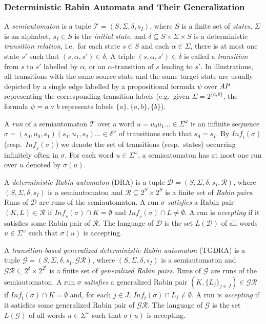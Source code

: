 \documentclass{llncs}
\newcommand{\AP}{\mathit{A\hskip-0.1ex P}}
\newcommand{\mD}{\mathcal{D}}
\newcommand{\mG}{\mathcal{G}}
\newcommand{\mT}{\mathcal{T}}
\newcommand{\Inf}{\mathit{Inf\!}}
\begin{document}
\subsubsection{Deterministic Rabin Automata and Their Generalization}



A \emph{semiautomaton} is a tuple $\mT=(S,\Sigma,\delta,s_I)$, where $S$ is
a finite set of \emph{states}, $\Sigma$ is an alphabet, $s_I\in S$ is the
\emph{initial state}, and $\delta\subseteq S\times\Sigma\times S$ is a
deterministic \emph{transition relation}, i.e.~for each state $s\in S$ and
each $\alpha\in\Sigma$, there is at most one state $s'$ such that
$(s,\alpha,s')\in\delta$. A triple $(s,\alpha,s')\in\delta$ is called a
\emph{transition} from $s$ to $s'$ labelled by $\alpha$, or an
$\alpha$-transition of $s$ leading to $s'$.  In illustrations, all
transitions with the same source state and the same target state are usually
depicted by a single edge labelled by a propositional formula $\psi$ over
$\AP$ representing the corresponding transition labels (e.g.~given
$\Sigma=2^{\{a,b\}}$, the formula $\psi=a\vee b$ represents labels
$\{a\},\{a,b\},\{b\}$).

A \emph{run} of a semiautomaton $\mT$ over a word $u=
u_0u_1\ldots\in\Sigma^\omega$ is an infinite sequence $\sigma=
(s_0,u_0,s_1)(s_1,u_1,s_2)\ldots\in\delta^\omega$ of transitions such that
$s_0=s_I$. By $\Inf_t(\sigma)$ (resp.~$\Inf_s(\sigma)$) we denote the set of
transitions (resp.~states) occurring infinitely often in $\sigma$. For each
word $u\in\Sigma^\omega$, a semiautomaton has at most one run over $u$
denoted by $\sigma(u)$.

A \emph{deterministic Rabin automaton} (DRA) is a tuple
$\mD=(S,\Sigma,\delta,s_I,\mathcal{R})$, where $(S,\Sigma,\delta,s_I)$ is a
semiautomaton and $\mathcal{R} \subseteq 2^{S} \times 2^{S}$ is a finite set
of \emph{Rabin pairs}.
Runs of $\mD$ are runs of the semiautomaton.  A run $\sigma$ \emph{satisfies}
a Rabin pair $(K,L)\in\mathcal{R}$ if $\Inf_s(\sigma)\cap K=\emptyset$ and
$\Inf_s(\sigma)\cap L\neq\emptyset$.  A run is \emph{accepting} if it
satisfies some Rabin pair of $\mathcal{R}$. The language of $\mD$ is the set
$L(\mD)$ of all words $u\in\Sigma^\omega$ such that $\sigma(u)$ is
accepting.



A \emph{transition-based generalized deterministic Rabin automaton} (TGDRA)
is a tuple $\mG=(S,\Sigma,\delta,s_I,\mathcal{GR})$, where
$(S,\Sigma,\delta,s_I)$ is a semiautomaton and $\mathcal{GR} \subseteq
2^{\delta} \times 2^{2^{\delta}}$ is a finite set of \emph{generalized Rabin
  pairs}.  
Runs of $\mG$ are runs of the semiautomaton.  A run $\sigma$
\emph{satisfies} a generalized Rabin pair $(K,\{L_j\}_{j\in
  J})\in\mathcal{GR}$ if $\Inf_t(\sigma)\cap K=\emptyset$ and, for each
$j\in J$, $\Inf_t(\sigma)\cap L_j\neq\emptyset$.  A run is \emph{accepting}
if it satisfies some generalized Rabin pair of $\mathcal{GR}$.  The language
of $\mG$ is the set $L(\mG)$ of all words $u\in\Sigma^\omega$ such that
$\sigma(u)$ is accepting.
\end{document}
